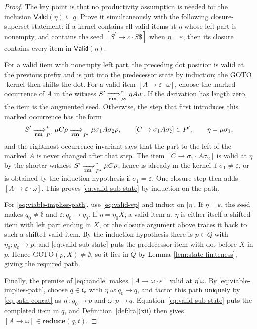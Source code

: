 \documentclass[11pt,a4paper]{article}
\theoremstyle{prettyplain}
\theoremstyle{prettydef}
\newcommand{\eps}{\varepsilon}
\newcommand{\RMP}{\xRightarrow[\mathbf{rm}]{}_{P^\prime}}
\newcommand{\Path}[3]{#1:#2\to#3}
\newcommand{\Item}[2]{[#1\to #2]}
\newcommand{\Reduce}{\mathbf{reduce}}
\begin{document}
\begin{proof}
The key point is that no productivity assumption is needed for the inclusion
\(\mathsf{Valid}(\eta)\subseteq q\).  Prove it simultaneously with the following
closure-superset statement: if a kernel contains all valid items at \(\eta\) whose
left part is nonempty, and contains the seed \(\Item{S^\prime}{\eps\cdot S\$}\)
when \(\eta=\eps\), then its closure contains every item in
\(\mathsf{Valid}(\eta)\).

For a valid item with nonempty left part, the preceding dot position is valid at
the previous prefix and is put into the predecessor state by induction; the
\(\mathrm{GOTO}\)-kernel then shifts the dot.  For a valid item
\(\Item{A}{\eps\cdot\omega}\), choose the marked occurrence of \(A\) in the
witness \(S^\prime\RMP^*\eta A w\).  If the derivation has length zero, the item
is the augmented seed.  Otherwise, the step that first introduces this marked
occurrence has the form
\[
S^\prime\RMP^*\mu C\rho
\RMP
\mu\sigma_1A\sigma_2\rho,
\qquad
\Item{C}{\sigma_1A\sigma_2}\in P^\prime,
\qquad
\eta=\mu\sigma_1,
\]
and the rightmost-occurrence invariant says that the part to the left of the
marked \(A\) is never changed after that step.  The item
\(\Item{C}{\sigma_1\cdot A\sigma_2}\) is valid at \(\eta\) by the shorter witness
\(S^\prime\RMP^*\mu C\rho\), hence is already in the kernel if
\(\sigma_1\ne\eps\), or is obtained by the induction hypothesis if
\(\sigma_1=\eps\).  One closure step then adds
\(\Item{A}{\eps\cdot\omega}\).  This proves \eqref{eq:valid-sub-state} by
induction on the path.

For \eqref{eq:viable-implies-path}, use \eqref{eq:valid-vp} and induct on
\(|\eta|\).  If \(\eta=\eps\), the seed makes \(q_0\ne\emptyset\) and
\(\Path{\eps}{q_0}{q_0}\).  If \(\eta=\eta_0X\), a valid item at \(\eta\) is either
itself a shifted item with left part ending in \(X\), or the closure argument
above traces it back to such a shifted valid item.  By the induction hypothesis
there is \(p\in Q\) with \(\Path{\eta_0}{q_0}{p}\), and
\eqref{eq:valid-sub-state} puts the predecessor item with dot before \(X\) in
\(p\).  Hence \(\mathrm{GOTO}(p,X)\ne\emptyset\), so it lies in \(Q\) by
Lemma~\ref{lem:state-finiteness}, giving the required path.

Finally, the premise of \eqref{eq:handle} makes
\(\Item{A}{\omega\cdot\eps}\) valid at \(\eta^\prime\omega\).  By
\eqref{eq:viable-implies-path}, choose \(q\in Q\) with
\(\Path{\eta^\prime\omega}{q_0}{q}\), and factor this path uniquely by
\eqref{eq:path-concat} as \(\Path{\eta^\prime}{q_0}{p}\) and
\(\Path{\omega}{p}{q}\).  Equation~\eqref{eq:valid-sub-state} puts the completed
item in \(q\), and Definition~\ref{def:lra}(xii) then gives
\(\Item{A}{\omega}\in\Reduce(q,t)\).
\end{proof}
\end{document}
